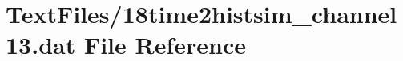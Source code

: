 \hypertarget{18time2histsim__channel13_8dat}{}\section{Text\+Files/18time2histsim\+\_\+channel13.dat File Reference}
\label{18time2histsim__channel13_8dat}
